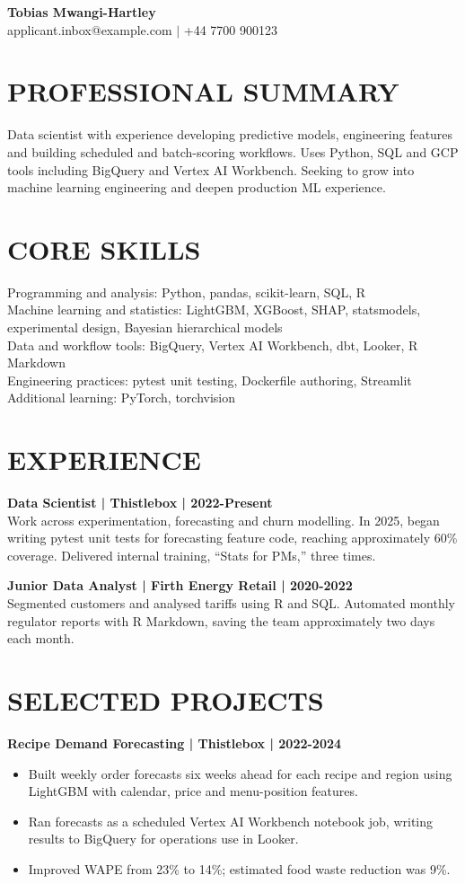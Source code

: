 \documentclass[11pt,a4paper]{article}
\newcommand{\cvsection}[1]{\section*{#1}}
\begin{document}
\begin{center}
{\Huge\bfseries\color{primarycolor} Tobias Mwangi-Hartley}\\[0.4em]
{\small applicant.inbox@example.com $|$ +44 7700 900123}
\end{center}

\cvsection{PROFESSIONAL SUMMARY}
Data scientist with experience developing predictive models, engineering features and building scheduled and batch-scoring workflows. Uses Python, SQL and GCP tools including BigQuery and Vertex AI Workbench. Seeking to grow into machine learning engineering and deepen production ML experience.

\cvsection{CORE SKILLS}
Programming and analysis: Python, pandas, scikit-learn, SQL, R\\
Machine learning and statistics: LightGBM, XGBoost, SHAP, statsmodels, experimental design, Bayesian hierarchical models\\
Data and workflow tools: BigQuery, Vertex AI Workbench, dbt, Looker, R Markdown\\
Engineering practices: pytest unit testing, Dockerfile authoring, Streamlit\\
Additional learning: PyTorch, torchvision

\cvsection{EXPERIENCE}
\textbf{Data Scientist | Thistlebox | 2022-Present}\\
Work across experimentation, forecasting and churn modelling. In 2025, began writing pytest unit tests for forecasting feature code, reaching approximately 60\% coverage. Delivered internal training, ``Stats for PMs,'' three times.

\vspace{0.5em}
\textbf{Junior Data Analyst | Firth Energy Retail | 2020-2022}\\
Segmented customers and analysed tariffs using R and SQL. Automated monthly regulator reports with R Markdown, saving the team approximately two days each month.

\cvsection{SELECTED PROJECTS}
\textbf{Recipe Demand Forecasting | Thistlebox | 2022-2024}
\begin{itemize}
\item Built weekly order forecasts six weeks ahead for each recipe and region using LightGBM with calendar, price and menu-position features.
\item Ran forecasts as a scheduled Vertex AI Workbench notebook job, writing results to BigQuery for operations use in Looker.
\item Improved WAPE from 23\% to 14\%; estimated food waste reduction was 9\%.
\end{itemize}
\end{document}

